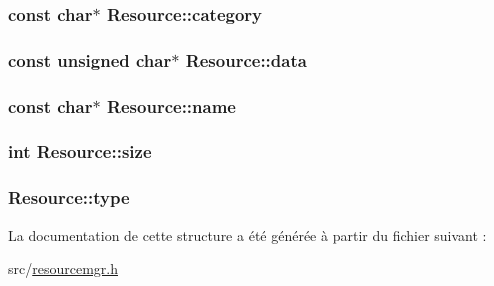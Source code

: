 \subsubsection[{category}]{\setlength{\rightskip}{0pt plus 5cm}const char$\ast$ Resource\+::category}\label{struct_resource_a8bbbf27d6106005f06d12e1489457188}
\hypertarget{struct_resource_ac5775d3448fb9ed16c0ec90dbed87a71}{}
\subsubsection[{data}]{\setlength{\rightskip}{0pt plus 5cm}const unsigned char$\ast$ Resource\+::data}\label{struct_resource_ac5775d3448fb9ed16c0ec90dbed87a71}
\hypertarget{struct_resource_a0695b8faedc32497170802bea7cf8ac7}{}
\subsubsection[{name}]{\setlength{\rightskip}{0pt plus 5cm}const char$\ast$ Resource\+::name}\label{struct_resource_a0695b8faedc32497170802bea7cf8ac7}
\hypertarget{struct_resource_a0f8739be95e0d934239663ea7551060b}{}
\subsubsection[{size}]{\setlength{\rightskip}{0pt plus 5cm}int Resource\+::size}\label{struct_resource_a0f8739be95e0d934239663ea7551060b}
\hypertarget{struct_resource_ae73282ad08d3c990c8a0ff353e231ab3}{}
\subsubsection[{type}]{ Resource\+::type}\label{struct_resource_ae73282ad08d3c990c8a0ff353e231ab3}


La documentation de cette structure a été générée à partir du fichier suivant \+:\begin{DoxyCompactItemize}
\item 
src/\hyperlink{resourcemgr_8h}{resourcemgr.\+h}\end{DoxyCompactItemize}
